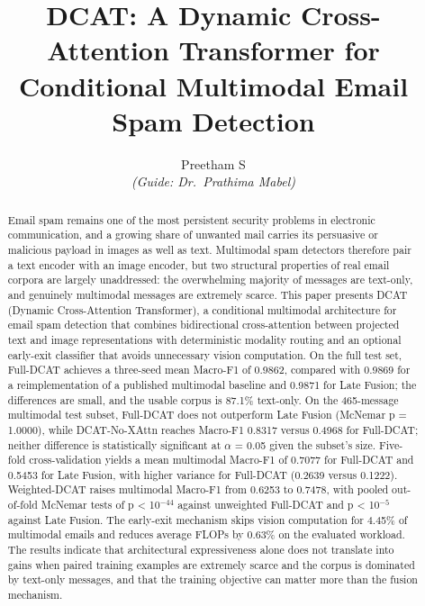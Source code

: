 \documentclass[10pt,twoside]{article}
\title{\bfseries DCAT: A Dynamic Cross-Attention Transformer for Conditional Multimodal Email Spam Detection}
\author{Preetham S\\{\normalsize\itshape (Guide: Dr.\ Prathima Mabel)}}
\date{}
\begin{document}
\maketitle
\thispagestyle{fancy}
\begin{abstract}
\noindent
Email spam remains one of the most persistent security problems in electronic communication, and a growing share of unwanted mail carries its persuasive or malicious payload in images as well as text. Multimodal spam detectors therefore pair a text encoder with an image encoder, but two structural properties of real email corpora are largely unaddressed: the overwhelming majority of messages are text-only, and genuinely multimodal messages are extremely scarce. This paper presents DCAT (Dynamic Cross-Attention Transformer), a conditional multimodal architecture for email spam detection that combines bidirectional cross-attention between projected text and image representations with deterministic modality routing and an optional early-exit classifier that avoids unnecessary vision computation. On the full test set, Full-DCAT achieves a three-seed mean Macro-F1 of 0.9862, compared with 0.9869 for a reimplementation of a published multimodal baseline and 0.9871 for Late Fusion; the differences are small, and the usable corpus is 87.1\% text-only. On the 465-message multimodal test subset, Full-DCAT does not outperform Late Fusion (McNemar p = 1.0000), while DCAT-No-XAttn reaches Macro-F1 0.8317 versus 0.4968 for Full-DCAT; neither difference is statistically significant at $\alpha$ = 0.05 given the subset's size. Five-fold cross-validation yields a mean multimodal Macro-F1 of 0.7077 for Full-DCAT and 0.5453 for Late Fusion, with higher variance for Full-DCAT (0.2639 versus 0.1222). Weighted-DCAT raises multimodal Macro-F1 from 0.6253 to 0.7478, with pooled out-of-fold McNemar tests of p < 10$^{-44}$ against unweighted Full-DCAT and p < 10$^{-5}$ against Late Fusion. The early-exit mechanism skips vision computation for 4.45\% of multimodal emails and reduces average FLOPs by 0.63\% on the evaluated workload. The results indicate that architectural expressiveness alone does not translate into gains when paired training examples are extremely scarce and the corpus is dominated by text-only messages, and that the training objective can matter more than the fusion mechanism.
\end{abstract}

\vspace{2pt}
\end{document}
